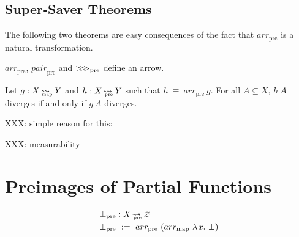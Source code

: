 \documentclass[preprint]{sigplanconf}
\newcommand{\arrowarr}{\ensuremath{arr}}
\newcommand{\arrowcomp}{\ensuremath{{>}\mspace{-6mu}{>}\mspace{-6mu}{>}}}
\newcommand{\arrowpair}{\ensuremath{pair}}
\newcommand{\map}{_\mathrm{map}}
\DeclareMathOperator{\mapto}{\rightsquigarrow_{\mspace{-21mu}\map}}
\newcommand{\arrmap}{\arrowarr\map}
\newcommand{\pre}{_\mathrm{pre}}
\DeclareMathOperator{\preto}{\rightsquigarrow_{\mspace{-19mu}\pre}}
\newcommand{\arrpre}{\arrowarr\pre}
\newcommand{\comppre}{\arrowcomp\pre}
\newcommand{\pairpre}{\arrowpair\pre}
\begin{document}
\subsection{Super-Saver Theorems}

The following two theorems are easy consequences of the fact that $\arrpre$ is a natural transformation.

\begin{corollary}
$\arrpre$, $\pairpre$ and $\comppre$ define an arrow.
\end{corollary}

\begin{corollary}
Let $g : X \mapto Y$ and $h : X \preto Y$ such that $h \ \equiv \ \arrpre~g$.
For all $A \subseteq X$, $h~A$ diverges if and only if $g~A$ diverges.
\end{corollary}

XXX: simple reason for this:
\begin{corollary}
XXX: measurability
\end{corollary}


\section{Preimages of Partial Functions}

\begin{equation}
\begin{aligned}
	&\bot\pre : X \preto \emptyset \\
	&\bot\pre \ := \ \arrpre~(\arrmap~\fun{x}\bot)
\end{aligned}
\end{equation}






\end{document}
